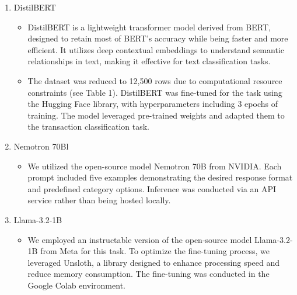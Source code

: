 \documentclass[12pt,letterpaper]{article}
\begin{document}
\begin{enumerate}
        \item {DistilBERT}
            \begin{itemize}
                \item {DistilBERT is a lightweight transformer model derived from BERT, designed to retain most of BERT’s accuracy while being faster and more efficient. It utilizes deep contextual embeddings to understand semantic relationships in text, making it effective for text classification tasks.}
                \item {The dataset was reduced to 12,500 rows due to computational resource constraints (see Table 1). DistilBERT was fine-tuned for the task using the Hugging Face library, with hyperparameters including 3 epochs of training. The model leveraged pre-trained weights and adapted them to the transaction classification task.}
            \end{itemize}
        \item {Nemotron 70Bl}
            \begin{itemize}
                \item {We utilized the open-source model Nemotron 70B from NVIDIA. Each prompt included five examples demonstrating the desired response format and predefined category options. Inference was conducted via an API service rather than being hosted locally.}
            \end{itemize}
        \item {Llama-3.2-1B}
            \begin{itemize}
                \item{We employed an instructable version of the open-source model Llama-3.2-1B from Meta for this task. To optimize the fine-tuning process, we leveraged Unsloth, a library designed to enhance processing speed and reduce memory consumption. The fine-tuning was conducted in the Google Colab environment.}
            \end{itemize}
    \end{enumerate}


\vspace{10cm} 
\end{document}

